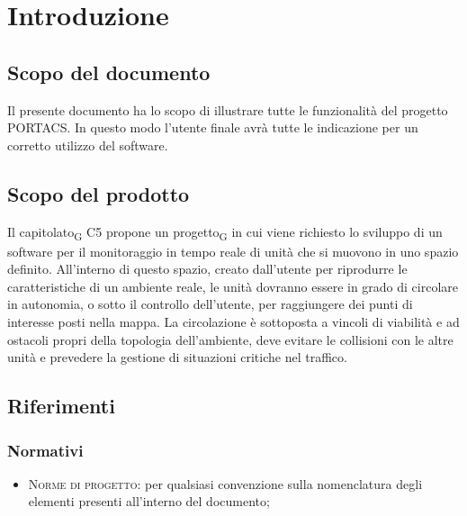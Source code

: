 \section{Introduzione}
\subsection{Scopo del documento}
    Il presente documento ha lo scopo di illustrare tutte le funzionalità del progetto PORTACS. In questo modo l'utente finale avrà tutte le indicazione per un corretto utilizzo del software.


\subsection{Scopo del prodotto}

    Il capitolato\textsubscript{G} C5 propone un progetto\textsubscript{G} in cui viene richiesto lo sviluppo di un software per il monitoraggio in tempo reale di unità che si muovono in uno spazio definito. All'interno di questo spazio, creato dall'utente per riprodurre le caratteristiche di un ambiente reale, le unità dovranno essere in grado di circolare in autonomia, o sotto il controllo dell'utente, per raggiungere dei punti di interesse posti nella mappa.  La circolazione è sottoposta a vincoli di viabilità e ad ostacoli propri della topologia dell'ambiente, deve evitare le collisioni con le altre unità e prevedere la gestione di situazioni critiche nel traffico.

\subsection{Riferimenti}
\label{ref}
    \subsubsection{Normativi}
    \begin{itemize}
    	\item \textsc{Norme di progetto}: per qualsiasi convenzione sulla nomenclatura degli elementi presenti all'interno del documento;
    	
    \end{itemize}

